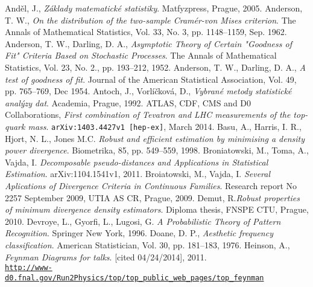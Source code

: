 
\begin{thebibliography}{10}
%
And\v{e}l, J., {\em Z\'aklady matematick\'e statistiky}. Matfyzpress, Prague, 2005.
Anderson, T. W., {\em On the distribution of the two-sample Cram\'er-von Mises criterion}. The Annals of Mathematical Statistics, Vol. 33, No. 3, pp. 1148--1159, Sep. 1962.
Anderson, T. W., Darling, D. A., {\em Asymptotic Theory of Certain "Goodness of Fit" Criteria Based on Stochastic Processes}. The Annals of Mathematical Statistics, Vol. 23, No. 2., pp. 193--212, 1952.
Anderson, T. W., Darling, D. A., {\em A test of goodness of fit}. Journal of the American Statistical Association, Vol. 49, pp. 765--769, Dec 1954.
Antoch, J., Vorl\'i\v{c}kov\'a, D., {\em Vybran\'e metody statistick\'e anal\'yzy dat}. Academia, Prague, 1992.
ATLAS, CDF, CMS and D0 Collaborations, {\em First combination of Tevatron and LHC measurements of the top-quark mass}. \texttt{arXiv:1403.4427v1 [hep-ex]}, March 2014.
Basu, A., Harris, I. R., Hjort, N. L., Jones M.C. {\em Robust and efficient estimation by minimising a density power divergence}. Biometrika, 85, pp. 549--559, 1998.
Broniatowski, M., Toma, A., Vajda, I. {\em Decomposable pseudo-distances and Applications in Statistical Estimation}. arXiv:1104.1541v1, 2011.
Broiatowski, M., Vajda, I. {\em Several Aplications of Divergence Criteria in Continuous Families}. Research report No 2257 September 2009, UTIA AS CR, Prague, 2009.
Demut, R.{\em Robust properties of minimum divergence density estimators}. Diploma thesis, FNSPE CTU, Prague, 2010.
Devroye, L., Gyorfi, L., Lugosi, G. {\em A Probabilistic Theory of Pattern Recognition}. Springer New York, 1996.
Doane, D. P., {\em Aesthetic frequency classification}. American Statistician, Vol. 30, pp. 181--183, 1976.
Heinson, A., {\em Feynman Diagrams for talks}. [cited 04/24/2014], 2011. \\ \href{http://www-d0.fnal.gov/Run2Physics/top/top_public_web_pages/top_feynman_diagrams.html}{\texttt{http://www-d0.fnal.gov/Run2Physics/top/top\_public\_web\_pages/top\_feynman}} \\

\end{thebibliography}
